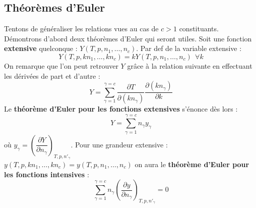 \documentclass[11pt, a4paper, openany]{book}
\begin{document}
		\subsection{Théorèmes d'Euler}
		Tentons de généraliser les relations vues au cas de $c > 1$ constituants. Démontrons d'abord deux théorèmes d'Euler qui seront utiles. Soit  une fonction \textbf{extensive} quelconque : $Y(T, p, n_1, \dots, n_c)$. Par def de la variable extensive :
		\begin{equation}
			Y(T, p, kn_1, \dots, kn_c) = kY(T, p, n_1, \dots, n_c)\ \ \forall k
		\end{equation}
		On remarque que l'on peut retrouver $Y$ grâce à la relation suivante en effectuant les dérivées de part et d'autre :
		\begin{equation}
			Y = \sum_{\gamma = 1}^{\gamma = c} \frac{\partial T}{\partial (kn_\gamma)}\frac{\partial (kn_\gamma)}{\partial k}
		\end{equation}
		Le \textbf{théorème d'Euler pour les fonctions extensives} s'énonce dès lors :
		\begin{equation}
			Y = \sum _{\gamma = 1}^{\gamma = c} n_\gamma y_\gamma
		\end{equation}
		où $y_\gamma = \left(\dfrac{\partial Y}{\partial n_\gamma}\right)_{T,p,n'_\gamma}$. Pour une grandeur extensive : $y(T, p, kn_1,\dots, kn_c) = y(T, p,n_1,\dots, n_c)$ on aura le \textbf{théorème d'Euler pour les fonctions intensives} :
		\begin{equation}
			\sum_{\gamma = 1}^{\gamma = c} n_\gamma\left(\dfrac{\partial y}{\partial n_\gamma}\right)_{T, p, n'_\gamma} = 0
		\end{equation}
\end{document}
